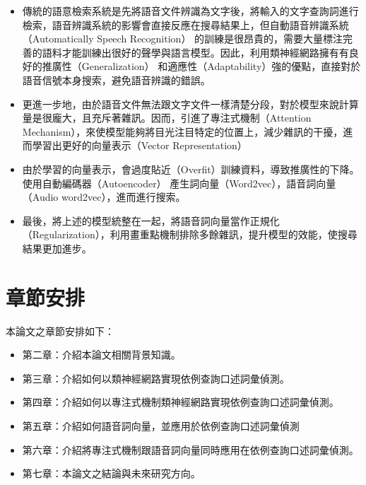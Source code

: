 \begin{itemize}
\itemsep -2pt %
  \item
	  傳統的語意檢索系統是先將語音文件辨識為文字後，將輸入的文字查詢詞進行檢索，語音辨識系統的影響會直接反應在搜尋結果上，但自動語音辨識系統（Automatically Speech Recognition）
的訓練是很昂貴的，需要大量標注完善的語料才能訓練出很好的聲學與語言模型。因此，利用類神經網路擁有有良好的推廣性（Generalization）
和適應性（Adaptability）強的優點，直接對於語音信號本身搜索，避免語音辨識的錯誤。
  \item
	  更進一步地，由於語音文件無法跟文字文件一樣清楚分段，對於模型來說計算量是很龐大，且充斥著雜訊。因而，引進了專注式機制（Attention
	  Mechanism），來使模型能夠將目光注目特定的位置上，減少雜訊的干擾，進而學習出更好的向量表示（Vector Representation）
  \item
	  由於學習的向量表示，會過度貼近（Overfit）訓練資料，導致推廣性的下降。使用自動編碼器（Autoencoder）\cite{vincent2008extracting,li2015hierarchical,baldi2012autoencoders}
	  產生詞向量（Word2vec），語音詞向量（Audio word2vec）\cite{mikolov2013distributed,mikolov2013efficient,pennington2014glove,chung2016audio}，進而進行搜索。
  \item
	  最後，將上述的模型統整在一起，將語音詞向量當作正規化（Regularization），利用畫重點機制排除多餘雜訊，提升模型的效能，使搜尋結果更加進步。

\end{itemize}

\section{章節安排}
本論文之章節安排如下：

\begin{itemize}
\itemsep -2pt %
  \item  第二章：介紹本論文相關背景知識。
  \item  第三章：介紹如何以類神經網路實現依例查詢口述詞彙偵測。
  \item  第四章：介紹如何以專注式機制類神經網路實現依例查詢口述詞彙偵測。
  \item  第五章：介紹如何語音詞向量，並應用於依例查詢口述詞彙偵測
  \item  第六章：介紹將專注式機制跟語音詞向量同時應用在依例查詢口述詞彙偵測。
  \item  第七章：本論文之結論與未來研究方向。
\end{itemize}

